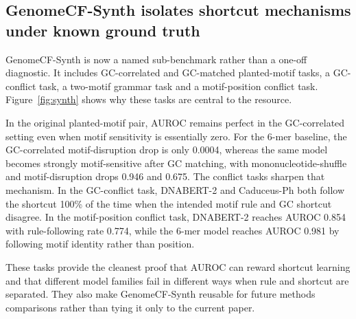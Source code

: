 \documentclass[11pt]{article}
\begin{document}
\begin{table}[t]
  \centering
  \caption{MPRA case-study summary. The GenomeCF-aware recommendation changes configuration choice on BCL11A and model choice on MYC because the biologically useful external metrics differ from the held-out benchmark ranking.}
  \label{tab:case}
  \small
  \resizebox{\textwidth}{!}{}
\end{table}

\begin{table}[t]
  \centering
  \caption{Controlled real-task motif probes. Small motif-minus-random effects indicate that the completed real-task predictions are not strongly explained by these simple known motif hits alone.}
  \label{tab:motif-main}
  \small
  \resizebox{\textwidth}{!}{}
\end{table}

\subsection{GenomeCF-Synth isolates shortcut mechanisms under known ground truth}
GenomeCF-Synth is now a named sub-benchmark rather than a one-off diagnostic. It includes GC-correlated and GC-matched planted-motif tasks, a GC-conflict task, a two-motif grammar task and a motif-position conflict task. Figure~\ref{fig:synth} shows why these tasks are central to the resource.

In the original planted-motif pair, AUROC remains perfect in the GC-correlated setting even when motif sensitivity is essentially zero. For the 6-mer baseline, the GC-correlated motif-disruption drop is only 0.0004, whereas the same model becomes strongly motif-sensitive after GC matching, with mononucleotide-shuffle and motif-disruption drops 0.946 and 0.675. The conflict tasks sharpen that mechanism. In the GC-conflict task, DNABERT-2 and Caduceus-Ph both follow the shortcut 100\% of the time when the intended motif rule and GC shortcut disagree. In the motif-position conflict task, DNABERT-2 reaches AUROC 0.854 with rule-following rate 0.774, while the 6-mer model reaches AUROC 0.981 by following motif identity rather than position.

These tasks provide the cleanest proof that AUROC can reward shortcut learning and that different model families fail in different ways when rule and shortcut are separated. They also make GenomeCF-Synth reusable for future methods comparisons rather than tying it only to the current paper.
\end{document}

